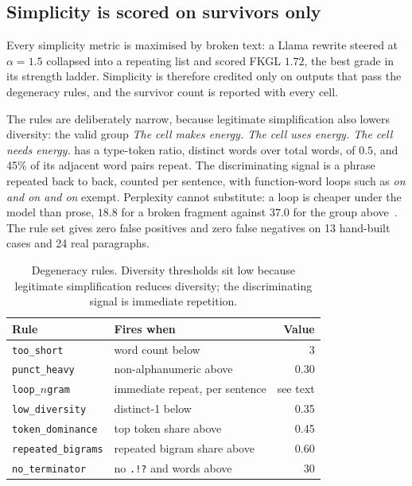\documentclass[aps,prb,reprint,nofootinbib,a4paper]{revtex4-2}
\newcommand{\code}[1]{\texttt{\small #1}}
\begin{document}
\subsection{Simplicity is scored on survivors only}
\label{sec:gate}

Every simplicity metric is maximised by broken text: a Llama rewrite steered
at $\alpha=1.5$ collapsed into a repeating list and scored FKGL $1.72$, the
best grade in its strength ladder. Simplicity is therefore credited only on
outputs that pass the degeneracy rules, and the survivor count is reported with
every cell.

The rules are deliberately narrow, because legitimate simplification also
lowers diversity: the valid group \emph{The cell makes energy. The cell uses
energy. The cell needs energy.} has a type-token ratio, distinct words over
total words, of $0.5$, and 45\% of its adjacent word pairs repeat. The
discriminating signal is a phrase repeated back to back, counted per sentence,
with function-word loops such as \emph{on and on and on} exempt. Perplexity
cannot substitute: a loop is cheaper under the model than prose, $18.8$ for a
broken fragment against $37.0$ for the group above~\cite{holtzman2020}. The
rule set gives zero false positives and zero false negatives on 13 hand-built
cases and 24 real paragraphs.

\begin{table}[t]
\centering
\small
\caption{Degeneracy rules. Diversity thresholds sit low because legitimate
simplification reduces diversity; the discriminating signal is immediate
repetition.}
\begin{tabular}{@{}llr@{}}
\toprule
Rule & Fires when & Value \\
\midrule
\code{too\_short}        & word count below       & 3 \\
\code{punct\_heavy}      & non-alphanumeric above & 0.30 \\
\code{loop\_$n$gram}     & immediate repeat, per sentence & see text \\
\code{low\_diversity}    & distinct-1 below       & 0.35 \\
\code{token\_dominance}  & top token share above  & 0.45 \\
\code{repeated\_bigrams} & repeated bigram share above & 0.60 \\
\code{no\_terminator}    & no \code{.!?} and words above & 30 \\
\bottomrule
\end{tabular}
\label{tab:degen}
\end{table}
\end{document}

